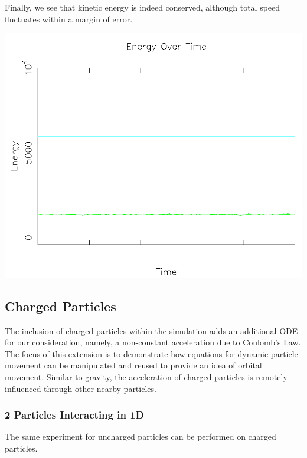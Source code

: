 \documentclass{article}
\begin{document}
Finally, we see that kinetic energy is indeed conserved, although total speed fluctuates within a margin of error.
\\
\begin{center}
    \includegraphics[scale=0.5]{uncharged_random_energy}
\end{center}

\subsection{Charged Particles}
The inclusion of charged particles within the simulation adds an additional ODE for our consideration,
namely, a non-constant acceleration due to Coulomb's Law.
The focus of this extension is to demonstrate how equations for dynamic particle movement
can be manipulated and reused to provide an idea of orbital movement.
Similar to gravity, the acceleration of charged particles is remotely influenced through other nearby particles.

\subsubsection{2 Particles Interacting in 1D}
The same experiment for uncharged particles can be performed on charged particles.
\end{document}
